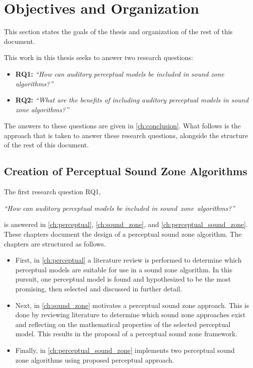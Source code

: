 \section{Objectives and Organization}
\label{ch:introduction:objectives}
This section states the goals of the thesis and organization of the rest of this document.

This work in this thesis seeks to answer two research questions:
\begin{itemize}
    \item \textbf{RQ1:} {\textit{``How can auditory perceptual models be included in sound zone algorithms?''}}
    \item \textbf{RQ2:} {\textit{``What are the benefits of including auditory perceptual models in sound zone algorithms?''}}
\end{itemize}

The answers to these questions are given in \autoref{ch:conclusion}. 
What follows is the approach that is taken to answer these research questions, alongside the structure of the rest of this document.

\subsection{Creation of Perceptual Sound Zone Algorithms}
The first research question RQ1, 

\begin{center}
    {\textit{``How can auditory perceptual models be included in sound~zone~algorithms?''}}
\end{center}

is answered in \autoref{ch:perceptual}, \autoref{ch:sound_zone}, and \autoref{ch:perceptual_sound_zone}.
These chapters document the design of a perceptual sound zone algorithm.
The chapters are structured as follows.
\begin{itemize}
    \item First, in \autoref{ch:perceptual} a literature review is performed to determine which perceptual models are suitable for use in a 
        sound zone algorithm.
        In this pursuit, one perceptual model is found and hypothesized to be the most promising, then selected and discussed in further detail.
    \item Next, in \autoref{ch:sound_zone} motivates a perceptual sound zone approach.
        This is done by reviewing literature to determine which sound zone approaches exist 
        and reflecting on the mathematical properties of the selected perceptual model.
        This results in the proposal of a perceptual sound zone framework.
    \item Finally, in \autoref{ch:perceptual_sound_zone} implements two perceptual sound zone algorithms using proposed perceptual approach.
\end{itemize}

